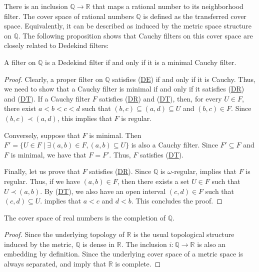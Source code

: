 \documentclass[reqno]{amsart}
\newcommand{\axref}[1]{(\hyperref[ax:#1]{#1})}
\theoremstyle{definition}
\theoremstyle{remark}
\numberwithin{figure}{section}
\newcommand{\rb}{\prec}
\begin{document}
There is an inclusion $\mathbb{Q} \to \mathbb{R}$ that maps a rational number to its neighborhood filter.
The cover space of rational numbers $\mathbb{Q}$ is defined as the transferred cover space.
Equivalently, it can be described as induced by the metric space structure on $\mathbb{Q}$.
The following proposition shows that Cauchy filters on this cover space are closely related to Dedekind filters:

\begin{prop}
A filter on $\mathbb{Q}$ is a Dedekind filter if and only if it is a minimal Cauchy filter.
\end{prop}
\begin{proof}
Clearly, a proper filter on $\mathbb{Q}$ satisfies \axref{DE} if and only if it is Cauchy.
Thus, we need to show that a Cauchy filter is minimal if and only if it satisfies \axref{DR} and \axref{DT}.
If a Cauchy filter $F$ satisfies \axref{DR} and \axref{DT}, then, for every $U \in F$, there exist $a < b < c < d$ such that $(b,c) \subseteq (a,d) \subseteq U$ and $(b,c) \in F$.
Since $(b,c) \rb (a,d)$, this implies that $F$ is regular.

Conversely, suppose that $F$ is minimal.
Then $F' = \{ U \in F \mid \exists (a,b) \in F, (a,b) \subseteq U \}$ is also a Cauchy filter.
Since $F' \subseteq F$ and $F$ is minimal, we have that $F = F'$.
Thus, $F$ satisfies \axref{DT}.

Finally, let us prove that $F$ satisfies \axref{DR}.
Since $\mathbb{Q}$ is $\omega$-regular,  implies that $F$ is regular.
Thus, if we have $(a,b) \in F$, then there exists a set $U \in F$ such that $U \rb (a,b)$.
By \axref{DT}, we also have an open interval $(c,d) \in F$ such that $(c,d) \subseteq U$.
 implies that $a < c$ and $d < b$.
This concludes the proof.
\end{proof}

\begin{prop}
The cover space of real numbers is the completion of $\mathbb{Q}$.
\end{prop}
\begin{proof}
Since the underlying topology of $\mathbb{R}$ is the usual topological structure induced by the metric, $\mathbb{Q}$ is dense in $\mathbb{R}$.
The inclusion $i : \mathbb{Q} \to \mathbb{R}$ is also an embedding by definition.
Since the underlying cover space of a metric space is always separated,  and  imply that $\mathbb{R}$ is complete.
\end{proof}
\end{document}

